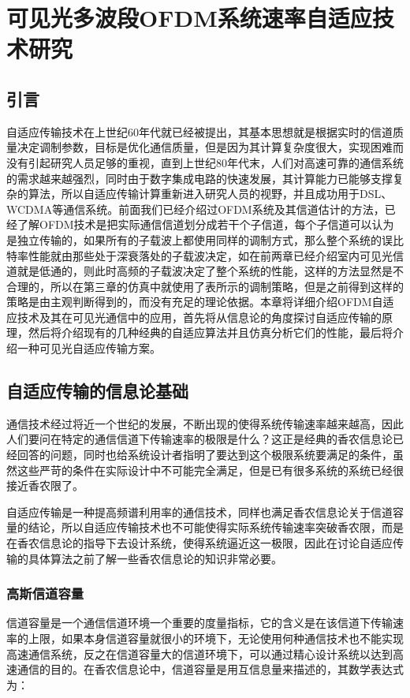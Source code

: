 \chapter{可见光多波段OFDM系统速率自适应技术研究}
\section{引言}
自适应传输技术在上世纪60年代就已经被提出，其基本思想就是根据实时的信道质量决定调制参数，目标是优化通信质量，但是因为其计算复杂度很大，实现困难而没有引起研究人员足够的重视\cite{徐凌峰2007ofdm}，直到上世纪80年代末，人们对高速可靠的通信系统的需求越来越强烈，同时由于数字集成电路的快速发展，其计算能力已能够支撑复杂的算法，所以自适应传输计算重新进入研究人员的视野，并且成功用于DSL、WCDMA等通信系统。前面我们已经介绍过OFDM系统及其信道估计的方法，已经了解OFDM技术是把实际通信信道划分成若干个子信道，每个子信道可以认为是独立传输的，如果所有的子载波上都使用同样的调制方式，那么整个系统的误比特率性能就由那些处于深衰落处的子载波决定，如在前两章已经介绍室内可见光信道就是低通的，则此时高频的子载波决定了整个系统的性能，这样的方法显然是不合理的，所以在第三章的仿真中就使用了表所示的调制策略，但是之前得到这样的策略是由主观判断得到的，而没有充足的理论依据。本章将详细介绍OFDM自适应技术及其在可见光通信中的应用，首先将从信息论的角度探讨自适应传输的原理，然后将介绍现有的几种经典的自适应算法并且仿真分析它们的性能，最后将介绍一种可见光自适应传输方案。
\section{自适应传输的信息论基础}
通信技术经过将近一个世纪的发展，不断出现的使得系统传输速率越来越高，因此人们要问在特定的通信信道下传输速率的极限是什么？这正是经典的香农信息论已经回答的问题，同时也给系统设计者指明了要达到这个极限系统要满足的条件，虽然这些严苛的条件在实际设计中不可能完全满足，但是已有很多系统的系统已经很接近香农限了。

自适应传输是一种提高频谱利用率的通信技术，同样也满足香农信息论关于信道容量的结论，所以自适应传输技术也不可能使得实际系统传输速率突破香农限，而是在香农信息论的指导下去设计系统，使得系统逼近这一极限，因此在讨论自适应传输的具体算法之前了解一些香农信息论的知识非常必要。
\subsection{高斯信道容量}
信道容量是一个通信信道环境一个重要的度量指标，它的含义是在该信道下传输速率的上限，如果本身信道容量就很小的环境下，无论使用何种通信技术也不能实现高速通信系统，反之在信道容量大的信道环境下，可以通过精心设计系统以达到高速通信的目的。在香农信息论中，信道容量是用互信息量来描述的，其数学表达式为：

